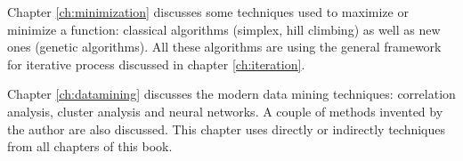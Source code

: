 \documentclass[twoside]{book}
\begin{document}
Chapter \ref{ch:minimization} discusses some techniques used to
maximize or minimize a function: classical algorithms (simplex,
hill climbing) as well as new ones (genetic algorithms). All these
algorithms are using the general framework for iterative process
discussed in chapter \ref{ch:iteration}.

Chapter \ref{ch:datamining} discusses the modern data mining
techniques: correlation analysis, cluster analysis and neural
networks. A couple of methods invented by the author are also
discussed. This chapter uses directly or indirectly techniques
from all chapters of this book.

\ifx\wholebook\relax\else
\end{document}
